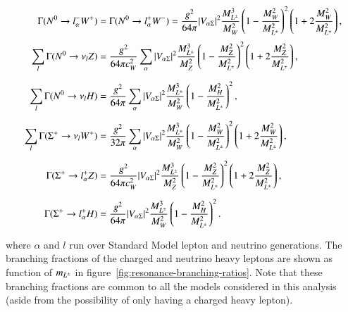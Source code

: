 %
\begin{align}
\label{eq:Gammatr0W}
\Gamma(\lzero \to l_\alpha^- W^+) &=  \Gamma(\lzero \to l_\alpha^+ W^-) =
\frac{g^2}{64 \pi} |V_{\alpha\Sigma}|^2
\frac{M_{\lpm}^3}{M_W^2} \left( 1- \frac{M_W^2}{M_{\lpm}^2} \right)^2 
\left( 1 + 2 \frac{M_W^2}{M_{\lpm}^2} \right) , 
\\[0.1cm]
\label{eq:Gammatr0Z}
\sum_l\Gamma(\lzero \to \nu_l Z) &=  \frac{g^2}{64 \pi c_W^2} 
\sum_\alpha |V_{\alpha\Sigma}|^2
\frac{M_{\lpm}^3}{M_Z^2} \left( 1- \frac{M_Z^2}{M_{\lpm}^2} \right)^2 
\left( 1 + 2 \frac{M_Z^2}{M_{\lpm}^2}\right),
\\[0.2cm]
\label{eq:Gammatr0h}
\sum_l\Gamma(\lzero \to \nu_l H) &=  \frac{g^2}{64 \pi} 
\sum_\alpha |V_{\alpha\Sigma}|^2
\frac{M_{\lpm}^3}{M_W^2} \left( 1- \frac{M_H^2}{M_{\lpm}^2} \right)^2 ,
\\[0.2cm]
\label{eq:Gammatr+W}
\sum_l\Gamma(\Sigma^+ \to \nu_l W^+) &= 
\frac{g^2}{32 \pi} \sum_\alpha |V_{\alpha\Sigma}|^2
\frac{M_{\lpm}^3}{M_W^2} \left( 1- \frac{M_W^2}{M_{\lpm}^2} \right)^2 
\left( 1 + 2 \frac{M_W^2}{M_{\lpm}^2} \right) ,
\\[0.2cm]
\label{eq:Gammatr+Z}
\Gamma(\Sigma^+ \to l_\alpha^+ Z) &= 
\frac{g^2}{64 \pi c_W^2} |V_{\alpha\Sigma}|^2
\frac{M_{\lpm}^3}{M_Z^2} \left( 1- \frac{M_Z^2}{M_{\lpm}^2} \right)^2 
\left( 1 + 2 \frac{M_Z^2}{M_{\lpm}^2}\right),
\\[0.2cm]
\label{eq:Gammatr+h}
\Gamma(\Sigma^+ \to l_\alpha^+ H) &= \frac{g^2}{64 \pi} |V_{\alpha\Sigma}|^2
\frac{M_{\lpm}^3}{M_W^2} \left( 1- \frac{M_H^2}{M_{\lpm}^2} \right)^2 .
\end{align}

where $\alpha$ and $l$ run over Standard Model lepton and neutrino generations. The branching fractions of the charged and neutrino heavy leptons are shown as function of $m_{L^{\pm}}$ in figure~\ref{fig:resonance-branching-ratios}. Note that these branching fractions are common to all the models considered in this analysis (aside from the possibility of only having a charged heavy lepton).


